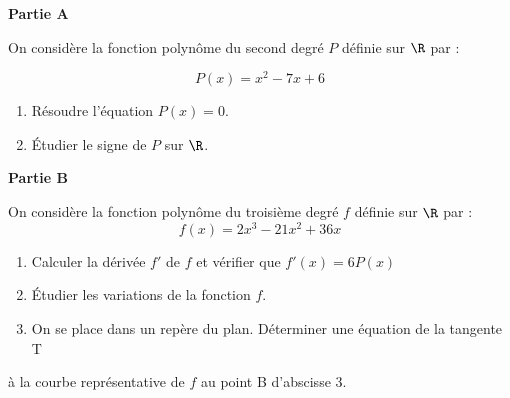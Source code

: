 \medskip

\textbf{Partie A}

\vspace{0.3cm}

On considère la fonction polynôme du second degré $P$ définie sur $ \R $ par :

\[P(x)=x^2-7x+6\]

\begin{enumerate}
\item  Résoudre l'équation $P(x)= 0$.
\item Étudier le signe de $P$ sur $\R$.
\end{enumerate}

\medskip

\textbf{Partie B}

\medskip

On considère la fonction polynôme du troisième degré $f$ définie sur $\R$ par :
\[f(x) = 2x^3 -21x^2 + 36x\]
\begin{enumerate}
\item  Calculer la dérivée $f'$ de $f$ et vérifier que $f'(x) = 6P(x)$
\item Étudier les variations de la fonction $f$.
\item On se place dans un repère du plan. Déterminer une équation de la tangente
T \end{enumerate}à la courbe représentative de $f$ au point B d'abscisse 3.

\vspace{0,5cm}
